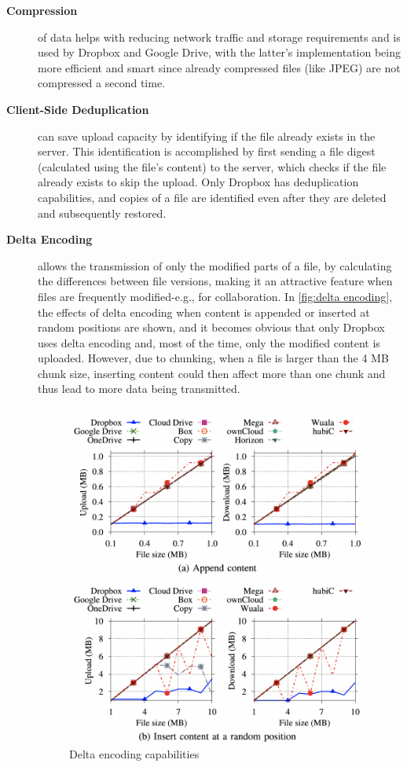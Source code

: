 \begin{description}
    \item[\textbf{Compression}] of data helps with reducing network traffic and storage requirements and is used by Dropbox and Google Drive, with the latter's implementation being more efficient and smart since already compressed files (like JPEG) are not compressed a second time.

    \item[\textbf{Client-Side Deduplication}] can save upload capacity by identifying if the file already exists in the server. This identification is accomplished by first sending a file digest (calculated using the file's content) to the server, which checks if the file already exists to skip the upload.  Only Dropbox has deduplication capabilities, and copies of a file are identified even after they are deleted and subsequently restored.

    \item[\textbf{Delta Encoding}] allows the transmission of only the modified parts of a file, by calculating the differences between file versions, making it an attractive feature when files are frequently modified-e.g., for collaboration.  In \autoref{fig:delta encoding}, the effects of delta encoding when content is appended or inserted at random positions are shown, and it becomes obvious that only Dropbox uses delta encoding and, most of the time, only the modified content is uploaded. However, due to chunking, when a file is larger than the 4 MB chunk size, inserting content could then affect more than one chunk and thus lead to more data being transmitted.

        \begin{figure} [h]
        \centering
        \includegraphics[scale=0.7]{images/delta_encoding}
        \caption{\label{fig:delta encoding}Delta encoding capabilities}
    \end{figure}


\end{description}
